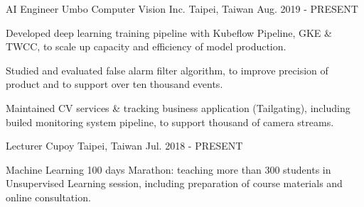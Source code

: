 

\begin{cventries}

  \cventry
    {AI Engineer} %
    {Umbo Computer Vision Inc.} %
    {Taipei, Taiwan} %
    {Aug. 2019 - PRESENT} %
    {
      \begin{cvitems} %
        \item {Developed deep learning training pipeline with Kubeflow Pipeline, GKE \& TWCC, to scale up capacity and efficiency of model production.}
        \item {Studied and evaluated false alarm filter algorithm, to improve precision of product and to support over ten thousand events.}
        \item {Maintained CV services \& tracking business application (Tailgating), including builed monitoring system pipeline, to support thousand of camera streams.}
      \end{cvitems}
    }

  \cventry
    {Lecturer} %
    {Cupoy} %
    {Taipei, Taiwan} %
    {Jul. 2018 - PRESENT} %
    {
      \begin{cvitems} %
        \item {Machine Learning 100 days Marathon: teaching more than 300 students in Unsupervised Learning session, including preparation of course materials and online consultation.}
      \end{cvitems}
    }


\end{cventries}
